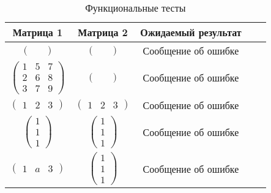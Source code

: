 \begin{table}[h]
	\begin{center}
		\captionsetup{justification=raggedright,singlelinecheck=off}
		\caption{\label{tab:tests} Функциональные тесты}
		\begin{tabular}{|c|c|c|c|c|}
		\hline
		Матрица 1 & Матрица 2 & Ожидаемый результат \\ 
		\hline

		$\begin{pmatrix}
			&
		\end{pmatrix}$ &
		$\begin{pmatrix}
			&
		\end{pmatrix}$ &
		Сообщение об ошибке \\ \hline
			
		$\begin{pmatrix}
			1 & 5 & 7\\
			2 & 6 & 8\\
			3 & 7 & 9
		\end{pmatrix}$ &
		$\begin{pmatrix}
			&
		\end{pmatrix}$ &
		Сообщение об ошибке \\ \hline

		$\begin{pmatrix}
			1 & 2 & 3
		\end{pmatrix}$ &
		$\begin{pmatrix}
			1 & 2 & 3
		\end{pmatrix}$ &
		Сообщение об ошибке \\ \hline

		$\begin{pmatrix}
			1 \\
			1 \\
			1
		\end{pmatrix}$ &
		$\begin{pmatrix}
			1 \\
			1 \\
			1
		\end{pmatrix}$ &
		Сообщение об ошибке \\ \hline

		$\begin{pmatrix}
			1 & a & 3
		\end{pmatrix}$ &
		$\begin{pmatrix}
			1 \\
			1 \\
			1
		\end{pmatrix}$ &
		Сообщение об ошибке \\ \hline
			

\end{tabular}
\end{center}
\end{table}
